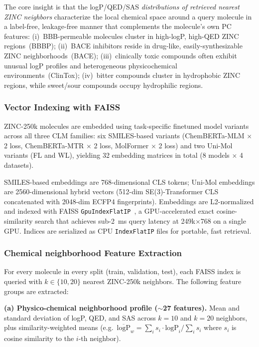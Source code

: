\documentclass[pdflatex,sn-mathphys-num]{sn-jnl}%
\theoremstyle{thmstyleone}%
\theoremstyle{thmstyletwo}%
\theoremstyle{thmstylethree}%
\begin{document}
The core insight is that the logP/QED/SAS \emph{distributions of retrieved nearest ZINC neighbors} characterize the local chemical space around a query molecule in a label-free, leakage-free manner that complements the molecule's own PC features:
(i)~BBB-permeable molecules cluster in high-logP, high-QED ZINC regions~(BBBP);
(ii)~BACE inhibitors reside in drug-like, easily-synthesizable ZINC neighborhoods~(BACE);
(iii)~clinically toxic compounds often exhibit unusual logP profiles and heterogeneous physicochemical environments~(ClinTox);
(iv)~bitter compounds cluster in hydrophobic ZINC regions, while sweet/sour compounds occupy hydrophilic regions.

\subsubsection{Vector Indexing with FAISS} \label{Vector_FAISS}
ZINC-250k molecules are embedded using task-specific finetuned model variants across all three CLM families: six SMILES-based variants (ChemBERTa-MLM $\times$ 2 loss, ChemBERTa-MTR $\times$ 2 loss, MolFormer $\times$ 2 loss) and two Uni-Mol variants (FL and WL), yielding 32 embedding matrices in total (8 models $\times$ 4 datasets).

SMILES-based embeddings are 768-dimensional CLS tokens; Uni-Mol embeddings are 2560-dimensional hybrid vectors (512-dim SE(3)-Transformer CLS concatenated with 2048-dim ECFP4 fingerprints). Embeddings are L2-normalized and indexed with FAISS \texttt{GpuIndexFlatIP}~\cite{johnson2021faiss}, a GPU-accelerated exact cosine-similarity
search that achieves sub-2~ms query latency at 249k$\times$768 on a single GPU.
Indices are serialized as CPU \texttt{IndexFlatIP} files for portable, fast retrieval.

\subsubsection{Chemical neighborhood Feature Extraction} \label{feature_extraction}
For every molecule in every split (train, validation, test), each FAISS index is queried with $k \in \{10, 20\}$ nearest ZINC-250k neighbors. The following feature groups are extracted:

\textbf{(a) Physico-chemical neighborhood profile ($\sim$27 features).}
Mean and standard deviation of logP, QED, and SAS across $k = 10$ and $k = 20$ neighbors, plus similarity-weighted means (e.g.\ $\overline{\text{logP}}_w = \sum_i s_i \cdot
\text{logP}_i / \sum_i s_i$ where $s_i$ is cosine similarity to the $i$-th neighbor).
\end{document}
